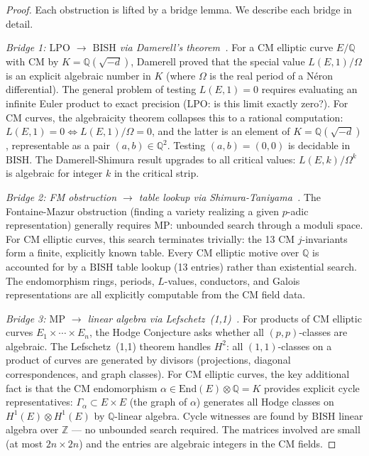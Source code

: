 \documentclass[11pt]{article}
\theoremstyle{definition}
\theoremstyle{remark}
\newcommand{\Z}{\mathbb{Z}}
\newcommand{\Q}{\mathbb{Q}}
\newcommand{\LPO}{\mathrm{LPO}}
\newcommand{\MP}{\mathrm{MP}}
\newcommand{\BISH}{\mathrm{BISH}}
\begin{document}
\begin{proof}
Each obstruction is lifted by a bridge lemma. We describe each bridge in detail.

\emph{Bridge 1: $\LPO$ $\to$ $\BISH$ via Damerell's theorem~\cite{Damerell1970}.} For a CM elliptic curve $E/\Q$ with CM by $K = \Q(\sqrt{-d})$, Damerell proved that the special value $L(E,1)/\Omega$ is an explicit algebraic number in $K$ (where $\Omega$ is the real period of a N\'eron differential). The general problem of testing $L(E,1) = 0$ requires evaluating an infinite Euler product to exact precision ($\LPO$: is this limit exactly zero?). For CM curves, the algebraicity theorem collapses this to a rational computation: $L(E,1) = 0 \iff L(E,1)/\Omega = 0$, and the latter is an element of $K = \Q(\sqrt{-d})$, representable as a pair $(a, b) \in \Q^2$. Testing $(a,b) = (0,0)$ is decidable in $\BISH$. The Damerell-Shimura result upgrades to all critical values: $L(E, k)/\Omega^k$ is algebraic for integer $k$ in the critical strip.

\emph{Bridge 2: FM obstruction $\to$ table lookup via Shimura-Taniyama~\cite{Shimura1971}.} The Fontaine-Mazur obstruction (finding a variety realizing a given $p$-adic representation) generally requires $\MP$: unbounded search through a moduli space. For CM elliptic curves, this search terminates trivially: the 13 CM $j$-invariants form a finite, explicitly known table. Every CM elliptic motive over $\Q$ is accounted for by a $\BISH$ table lookup (13 entries) rather than existential search. The endomorphism rings, periods, $L$-values, conductors, and Galois representations are all explicitly computable from the CM field data.

\emph{Bridge 3: $\MP$ $\to$ linear algebra via Lefschetz~(1,1)~\cite{Lefschetz1924}.} For products of CM elliptic curves $E_1 \times \cdots \times E_n$, the Hodge Conjecture asks whether all $(p,p)$-classes are algebraic. The Lefschetz~(1,1) theorem handles $H^2$: all $(1,1)$-classes on a product of curves are generated by divisors (projections, diagonal correspondences, and graph classes). For CM elliptic curves, the key additional fact is that the CM endomorphism $\alpha \in \mathrm{End}(E) \otimes \Q = K$ provides explicit cycle representatives: $\Gamma_\alpha \subset E \times E$ (the graph of $\alpha$) generates all Hodge classes on $H^1(E) \otimes H^1(E)$ by $\Q$-linear algebra. Cycle witnesses are found by $\BISH$ linear algebra over $\Z$ --- no unbounded search required. The matrices involved are small (at most $2n \times 2n$) and the entries are algebraic integers in the CM fields.


\end{proof}
\end{document}
